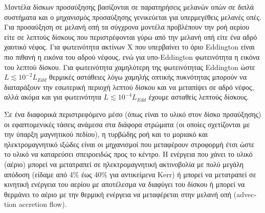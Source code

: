 Μοντέλα δίσκων προσαύξησης βασίζονται σε παρατηρήσεις μελανών οπών σε διπλά συστήματα και ο μηχανισμός προσαύξησης γενικεύεται για υπερμεγέθεις μελανές οπές. Για προσαύξηση σε μελανή οπή τα σύγχρονα μοντέλα προβλέπουν την ροή αερίου είτε σε λεπτούς δίσκους που περιστρέφονται γύρω από την μελανή οπή είτε ένα αδρό χαοτικό νέφος. Για φωτεινότητα ακτίνων Χ που υπερβαίνει το όριο \textlatin{Eddington} είναι πιο πιθανή η εικόνα του αδρού νέφους, ενώ για υπο-\textlatin{Eddington} φωτεινότητα η εικόνα του λεπτού δίσκου. Για φωτεινότητα χαμηλότερη της φωτεινότητας \textlatin{Eddington} ώστε $L \lesssim 10^{-2} L_{Edd}$ θερμικές αστάθειες λόγω χαμηλής οπτικής πυκνότητας μπορούν να διαταράξουν την εσωτερική περιοχή λεπτού δίσκου και να μεταπίψει σε αδρό νέφος, αλλά ακόμα και για φωτεινότητα $L\lesssim 10^{-4} L_{Edd}$ έχουμε ασταθείς λεπτούς δίσκους\cite{Lightman1974}. 

Σε ένα διαφορικά περιστρεφόμενο μέσο (όπως είναι το υλικό στον δίσκο πρσαύξησης) οι εφαπτομενικές τάσεις ανάμεσα στα διάφορα στρώματα (οι οποίες σχετίζονται με την ύπαρξη μαγνητικού πεδίου), η τυρβώδης ροή και το μοριακό και ηλεκτρομαγνητικό ιξώδες είναι οι μηχανισμοί που μεταφέρουν στροφορμή\cite{ShakuraBlackHoles} έτσι ώστε το υλικό να καταρεύσει σπειροειδώς προς το κέντρο. Η ενέργεια που χάνει το υλικό (αέριο) μπορεί να μετατραπεί σε ηλεκτρομαγνητική ακτινοβολία με πολύ μεγάλη απόδοση (είδαμε από 4\% έως 40\% για αντικείμενα \textlatin{Kerr}) ή μπορεί να μετατραπεί σε κινητική ενέργεια του αερίου με αποτέλεσμα να διαφύγει του δίσκου ή μπορεί να θερμάνει το αέριο με την θερμική ενέργεια να μεταφέρεται στην μελανή οπή (\textlatin{advection accretion flow})\cite{netzer_2013}.

